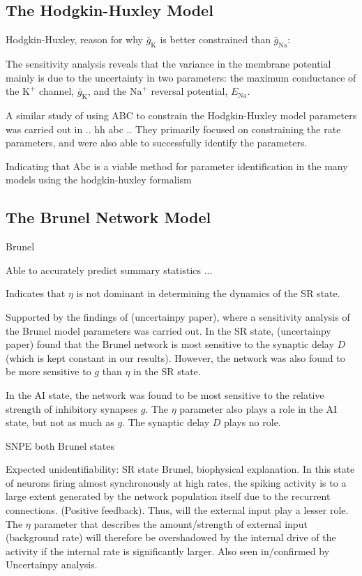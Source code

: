 \subsection{The Hodgkin-Huxley Model}

Hodgkin-Huxley, reason for why $\bar{g}_\mathrm{K}$ is better constrained than $\bar{g}_\mathrm{Na}$:

The sensitivity analysis reveals that the variance in the membrane potential mainly is due to the uncertainty in two parameters: the maximum conductance of the $\mathrm{K}^+$ channel, $\bar{g}_\mathrm{K}$, and the $\mathrm{Na}^+$ reversal potential, $E_\mathrm{Na}$.

A similar study of using ABC to constrain the Hodgkin-Huxley model parameters was carried out in .. hh abc .. They primarily focused on constraining the rate parameters, and were also able to successfully identify the parameters.  

Indicating that Abc is a viable method for parameter identification in the many models using the hodgkin-huxley formalism

\subsection{The Brunel Network Model}

Brunel 

Able to accurately predict summary statistics ...

Indicates that $\eta$ is not dominant in determining the dynamics of the SR state. 

Supported by the findings of (uncertainpy paper), where a sensitivity analysis of the Brunel model parameters was carried out. In the SR state, (uncertainpy paper) found that the Brunel network is most sensitive to the synaptic delay $D$ (which is kept constant in our results). However, the network was also found to be more sensitive to $g$ than $\eta$ in the SR state. 

In the AI state, the network was found to be most sensitive to the relative strength of inhibitory synapses $g$. The $\eta$ parameter also plays a role in the AI state, but not as much as $g$. The synaptic delay $D$ plays no role. 

SNPE both Brunel states

Expected unidentifiability: SR state Brunel, biophysical explanation. In this state of neurons firing almost synchronously at high rates, the spiking activity is to a large extent generated by the network population itself due to the recurrent connections. (Positive feedback). Thus, will the external input play a lesser role. The $\eta$ parameter that describes the amount/strength of external input (background rate) will therefore be overshadowed by the internal drive of the activity if the internal rate is significantly larger. Also seen in/confirmed by Uncertainpy analysis.

